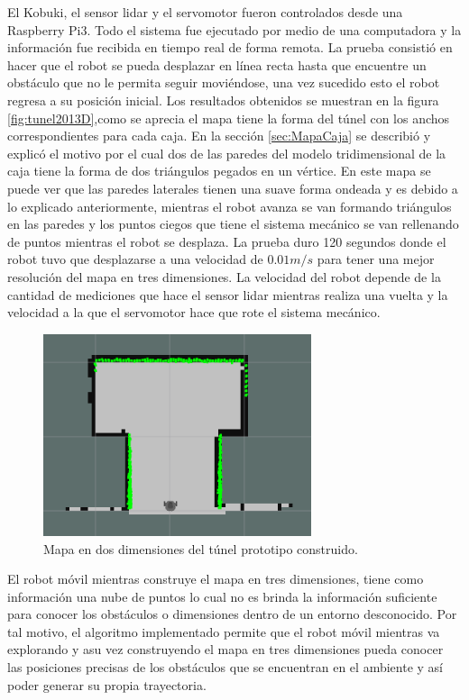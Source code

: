 El Kobuki, el sensor lidar y el servomotor fueron controlados desde una Raspberry Pi3. Todo 
el sistema fue ejecutado por medio de una computadora y la información fue recibida en tiempo 
real de forma remota. La prueba consistió en hacer que el robot se pueda desplazar en línea 
recta hasta que encuentre un obstáculo que no le permita seguir moviéndose, una vez sucedido 
esto el robot regresa a su posición inicial. Los resultados obtenidos se muestran en la figura
\ref{fig:tunel2013D},como se aprecia el mapa tiene la forma del túnel con los anchos correspondientes 
para cada caja. En la sección \ref{sec:MapaCaja} se describió y explicó el motivo por el cual dos 
de las paredes del modelo tridimensional de la caja tiene la forma de dos triángulos pegados en 
un vértice. En este mapa se puede ver que las paredes laterales tienen una suave forma ondeada 
y es debido a lo explicado anteriormente, mientras el robot avanza se van formando triángulos 
en las paredes y los puntos ciegos que tiene el sistema mecánico se van rellenando de puntos 
mientras el robot se desplaza. La prueba duro 120 segundos donde el robot tuvo que desplazarse 
a una velocidad de $0.01 m/s$ para tener una mejor resolución del mapa en tres dimensiones. La 
velocidad del robot depende de la cantidad de mediciones que hace el sensor lidar mientras 
realiza una vuelta y la velocidad a la que el servomotor hace que rote el sistema mecánico.

\begin{figure}
  \centering \footnotesize
  \includegraphics[width=0.70\textwidth]{images/slam2d.png}
  \captionsetup{font=footnotesize}
  \caption{Mapa en dos dimensiones del túnel prototipo construido.}
  \label{fig:SLAM201}
\end{figure}

El robot móvil mientras construye el mapa en tres dimensiones, tiene como información una nube 
de puntos lo cual no es brinda la información suficiente para conocer los obstáculos o 
dimensiones dentro de un entorno desconocido. Por tal motivo, el algoritmo implementado permite 
que el robot móvil mientras va explorando y asu vez construyendo el mapa en tres dimensiones 
pueda conocer las posiciones precisas de los obstáculos que se encuentran en el ambiente y así 
poder generar su propia trayectoria.

